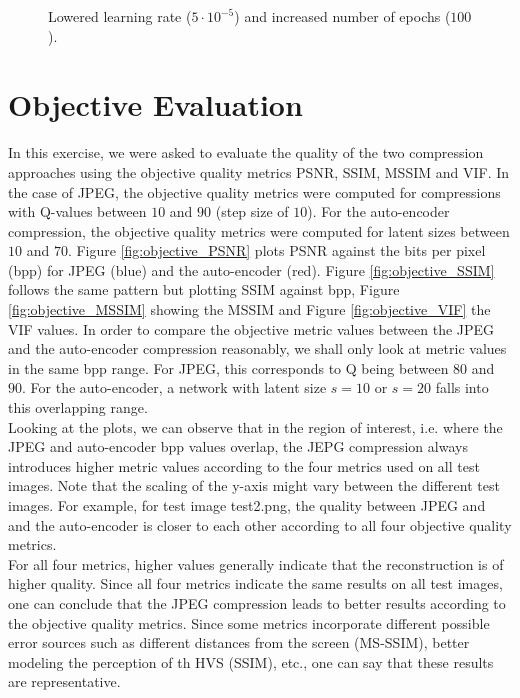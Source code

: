 \documentclass{article}
\begin{document}
\begin{figure}
\begin{subfigure}[b]{0.7 \textwidth}
    \end{subfigure}
    \caption{Lowered learning rate ($5 \cdot 10^{-5}$) and increased number of epochs ($100$).}
    \label{fig:auto_lr}
\end{figure}

\section{Objective Evaluation}
In this exercise, we were asked to evaluate the quality of the two compression approaches using the objective quality metrics PSNR, SSIM, MSSIM and VIF. In the case of JPEG, the objective quality metrics were computed for compressions with Q-values between $10$ and $90$ (step size of $10$). For the auto-encoder compression, the objective quality metrics were computed for latent sizes between $10$ and $70$. Figure \ref{fig:objective_PSNR} plots PSNR against the bits per pixel (bpp) for JPEG (blue) and the auto-encoder (red). Figure \ref{fig:objective_SSIM} follows the same pattern but plotting SSIM against bpp, Figure \ref{fig:objective_MSSIM} showing the MSSIM and Figure \ref{fig:objective_VIF} the VIF values. In order to compare the objective metric values between the JPEG and the auto-encoder compression reasonably, we shall only look at metric values in the same bpp range. For JPEG, this corresponds to Q being between $80$ and $90$. For the auto-encoder, a network with latent size $s=10$ or $s=20$ falls into this overlapping range. \\

Looking at the plots, we can observe that in the region of interest, i.e. where the JPEG and auto-encoder bpp values overlap, the JEPG compression always introduces higher metric values according to the four metrics used on all test images. Note that the scaling  of the y-axis might vary between the different test images. For example, for test image \textsf{test2.png}, the quality between JPEG and and the auto-encoder is closer to each other according to all four objective quality metrics. \\

For all four metrics, higher values generally indicate that the reconstruction is of higher quality. Since all four metrics indicate the same results on all test images, one can conclude that the JPEG compression leads to better results according to the objective quality metrics. Since some metrics incorporate different possible error sources such as different distances from the screen (MS-SSIM), better modeling the perception of th HVS (SSIM), etc., one can say that these results are representative.
\end{document}
